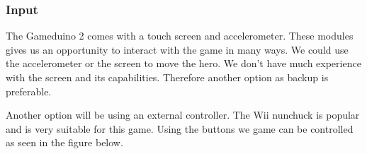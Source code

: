 \subsubsection{Input}
The Gameduino 2 comes with a touch screen and accelerometer.
These modules gives us an opportunity to interact with the game
in many ways. We could use the accelerometer or the screen to
move the hero. We don’t have much experience with the screen
and its capabilities. Therefore another option as backup is preferable.

Another option will be using an external controller. The Wii nunchuck is popular and is very suitable for this game.  Using the buttons we game can be controlled as seen in the figure below.



